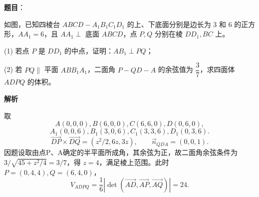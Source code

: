 \begin{answer}

\textbf{题目}：

如图，已知四棱台 \(ABCD-A_1B_1C_1D_1\) 的上、下底面分别是边长为 3 和 6 的正方形，\(AA_1=6\)，且 \(AA_1\perp\) 底面 \(ABCD\)，点 \(P,Q\) 分别在棱 \(DD_1,BC\) 上。
\nopagebreak[4]
\begin{center}\end{center}
\nopagebreak[4]
(1) 若点 \(P\) 是 \(DD_1\) 的中点，证明：\(AB_1\perp PQ\)；

(2) 若 \(PQ\parallel\) 平面 \(ABB_1A_1\)，二面角 \(P-QD-A\) 的余弦值为 \(\dfrac37\)，求四面体 \(ADPQ\) 的体积。

\textbf{解析}

取
\nopagebreak[4]
\[
A(0,0,0),B(6,0,0),C(6,6,0),D(0,6,0),
\]
\nopagebreak[4]
\[
A_1(0,0,6),B_1(3,0,6),C_1(3,3,6),D_1(0,3,6).
\]
\nopagebreak[4]
\[
\vec{DP}\times\vec{DQ}=(z^2/2,6z,3z),\qquad \vec n_{QDA}=(0,0,1).
\]
因题设取由点P、A确定的半平面所成角，其余弦为正，故二面角余弦条件为 \(3/\sqrt{45+z^2/4}=3/7\)，得 \(z=4\)，满足棱上范围。此时 \(P=(0,4,4),Q=(6,4,0)\)，
\nopagebreak[4]
\[
V_{ADPQ}=\frac16\left|\det(\vec{AD},\vec{AP},\vec{AQ})\right|=24.
\]



\end{answer}

